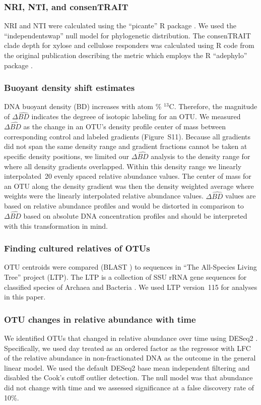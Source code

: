 \documentclass{article}
\begin{document}
\subsubsection{NRI, NTI, and consenTRAIT}
NRI and NTI were calculated using the ``picante'' R package
\citep{kembel2010}. We used the ``independentswap'' null model for
phylogenetic distribution. The consenTRAIT clade depth for xylose and cellulose
responders was calculated using R code from the original publication describing
the metric \citep{Martiny2013} which employs the R ``adephylo'' package
\citep{jombart2010}.

\subsubsection{Buoyant density shift estimates}
DNA buoyant density (BD) increases with atom \% $^{13}$C. Therefore, the
magnitude of $\Delta\hat{BD}$ indicates the degreee of isotopic labeling
for an OTU. We measured $\Delta\hat{BD}$ as the change in an OTU's density
profile center of mass between corresponding control and labeled gradients
(Figure~S11). Because all gradients did not span the same density range and
gradient fractions cannot be taken at specific density positions, we limited
our $\Delta\hat{BD}$ analysis to the density range for where all density gradients
overlapped. Within this density range we linearly interpolated~20
evenly spaced relative abundance values. The center of mass for an OTU along
the density gradient was then the density weighted average where weights were
the linearly interpolated relative abundance values. $\Delta\hat{BD}$ values are based on
relative abundance profiles and would be distorted in comparison to
$\Delta\hat{BD}$ based on absolute DNA concentration profiles and should be
interpreted with this transformation in mind.

\subsubsection{Finding cultured relatives of OTUs}
OTU centroids were compared (BLAST \citep{altschul1990,camacho2009}) to
sequences in ``The All-Species Living Tree'' project (LTP). The LTP is
a collection of SSU rRNA gene sequences for classified species of Archaea
and Bacteria \citep{yarza2008}. We used LTP version~115 for analyses in
this paper.

\subsubsection{OTU changes in relative abundance with time}
We identified OTUs that changed in relative abundance over time using
DESeq2 \citep{love2014}. Specifically, we used day treated as an ordered
factor as the regressor with LFC of the relative abundance in
non-fractionated DNA as the outcome in the general linear model. We used
the default DESeq2 base mean independent filtering and disabled the Cook's
cutoff outlier detection. The null model was that abundance did not change
with time and we assessed significance at a false discovery rate of 10\%. 
\end{document}
